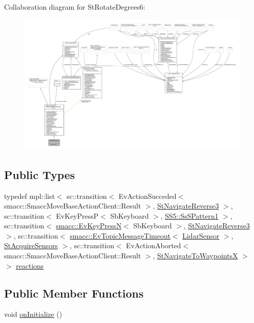 Collaboration diagram for St\+Rotate\+Degrees6\+:
\nopagebreak
\begin{figure}[H]
\begin{center}
\leavevmode
\includegraphics[width=350pt]{structStRotateDegrees6__coll__graph}
\end{center}
\end{figure}
\subsection*{Public Types}
\begin{DoxyCompactItemize}
\item 
typedef mpl\+::list$<$ sc\+::transition$<$ Ev\+Action\+Succeded$<$ smacc\+::\+Smacc\+Move\+Base\+Action\+Client\+::\+Result $>$, \hyperlink{structStNavigateReverse3}{St\+Navigate\+Reverse3} $>$, sc\+::transition$<$ Ev\+Key\+PressP$<$ Sb\+Keyboard $>$, \hyperlink{structSS5_1_1SsSPattern1}{S\+S5\+::\+Ss\+S\+Pattern1} $>$, sc\+::transition$<$ \hyperlink{structsmacc_1_1EvKeyPressN}{smacc\+::\+Ev\+Key\+PressN}$<$ Sb\+Keyboard $>$, \hyperlink{structStNavigateReverse3}{St\+Navigate\+Reverse3} $>$, sc\+::transition$<$ \hyperlink{structsmacc_1_1EvTopicMessageTimeout}{smacc\+::\+Ev\+Topic\+Message\+Timeout}$<$ \hyperlink{sensor__state_8h_a9db9e1944f88de79507758d08e4a2ee3}{Lidar\+Sensor} $>$, \hyperlink{structStAcquireSensors}{St\+Acquire\+Sensors} $>$, sc\+::transition$<$ Ev\+Action\+Aborted$<$ smacc\+::\+Smacc\+Move\+Base\+Action\+Client\+::\+Result $>$, \hyperlink{structStNavigateToWaypointsX}{St\+Navigate\+To\+WaypointsX} $>$ $>$ \hyperlink{structStRotateDegrees6_a4ae1a585700ec463a683a74b8f57bbdc}{reactions}
\end{DoxyCompactItemize}
\subsection*{Public Member Functions}
\begin{DoxyCompactItemize}
\item 
void \hyperlink{structStRotateDegrees6_ad83461ae95f2862d684609df5713d980}{on\+Initialize} ()
\end{DoxyCompactItemize}
